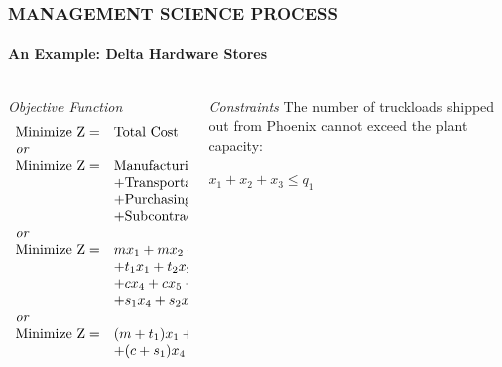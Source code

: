 \documentclass[14 pt]{beamer}
\begin{document}
\begin{frame}[t]
\frametitle{MANAGEMENT SCIENCE PROCESS}
\framesubtitle{An Example: Delta Hardware Stores}

\begin{columns}[t]
\begin{column}{0.45\textwidth}
\emph{Objective Function}
\vskip0.5cm%
\begin{equation*}
\begin{array}{lll}
\text{Minimize Z}  = & \text{Total Cost} \\
\text{\emph{or}} & & \\
\text{Minimize Z}  = & \text{Manufacturing Cost} \\
                     & + \text{Transportation Cost} \\
                     & + \text{Purchasing Cost} \\
                     & + \text{Subcontracting Cost}\\
\text{\emph{or}} & & \\
\text{Minimize Z}  = & m x_1 + m x_2 + m x_3          \\
                     & + t_1 x_1 + t_2 x_2 + t_3 x_3  \\
                     & + c x_4 + c x_5 + c x_6        \\
                     & + s_1 x_4 + s_2 x_5 + s_3 x_6  \\
\text{\emph{or}} & & \\
\text{Minimize Z}  = & (m + t_1) x_1 + (m+t_2) x_2 + (m+t_3) x_3 \\
                     & + (c + s_1) x_4 + (c + s_2) x_5 + (c + s_3) x_6 \\

\end{array}
\end{equation*}
\end{column}

\begin{column}{0.45\textwidth}
\emph{Constraints}
\vskip0.5cm%
The number of truckloads shipped out from Phoenix cannot exceed the plant capacity:
\begin{center}
  $x_1 + x_2 + x_3 \leq q_1$
\end{center}


\end{column}
\end{columns}
\end{frame}
\end{document}
